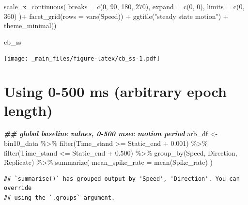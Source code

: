 \documentclass[
]{book}
\newenvironment{Shaded}{\begin{snugshade}}{\end{snugshade}}
\newcommand{\AttributeTok}[1]{\textcolor[rgb]{0.77,0.63,0.00}{#1}}
\newcommand{\DecValTok}[1]{\textcolor[rgb]{0.00,0.00,0.81}{#1}}
\newcommand{\DocumentationTok}[1]{\textcolor[rgb]{0.56,0.35,0.01}{\textbf{\textit{#1}}}}
\newcommand{\FloatTok}[1]{\textcolor[rgb]{0.00,0.00,0.81}{#1}}
\newcommand{\FunctionTok}[1]{\textcolor[rgb]{0.00,0.00,0.00}{#1}}
\newcommand{\NormalTok}[1]{#1}
\newcommand{\OtherTok}[1]{\textcolor[rgb]{0.56,0.35,0.01}{#1}}
\newcommand{\SpecialCharTok}[1]{\textcolor[rgb]{0.00,0.00,0.00}{#1}}
\newcommand{\StringTok}[1]{\textcolor[rgb]{0.31,0.60,0.02}{#1}}
\begin{document}
\begin{Shaded}
\begin{Highlighting}[]
  \FunctionTok{scale\_x\_continuous}\NormalTok{(}
    \AttributeTok{breaks =} \FunctionTok{c}\NormalTok{(}\DecValTok{0}\NormalTok{, }\DecValTok{90}\NormalTok{, }\DecValTok{180}\NormalTok{, }\DecValTok{270}\NormalTok{),}
    \AttributeTok{expand =} \FunctionTok{c}\NormalTok{(}\DecValTok{0}\NormalTok{, }\DecValTok{0}\NormalTok{),}
    \AttributeTok{limits =} \FunctionTok{c}\NormalTok{(}\DecValTok{0}\NormalTok{, }\DecValTok{360}\NormalTok{)}
\NormalTok{  )}\SpecialCharTok{+}
  \FunctionTok{facet\_grid}\NormalTok{(}\AttributeTok{rows =} \FunctionTok{vars}\NormalTok{(Speed)) }\SpecialCharTok{+}
  \FunctionTok{ggtitle}\NormalTok{(}\StringTok{"steady state motion"}\NormalTok{) }\SpecialCharTok{+}
  \FunctionTok{theme\_minimal}\NormalTok{()}

\NormalTok{cb\_ss}
\end{Highlighting}
\end{Shaded}

\texttt{[image: \_main\_files/figure-latex/cb\_ss-1.pdf]}

\hypertarget{using-0-500-ms-arbitrary-epoch-length}{%
\section{Using 0-500 ms (arbitrary epoch length)}\label{using-0-500-ms-arbitrary-epoch-length}}

\begin{Shaded}
\begin{Highlighting}[]
\DocumentationTok{\#\# global baseline values, 0{-}500 msec motion period}
\NormalTok{arb\_df }\OtherTok{\textless{}{-}}
\NormalTok{  bin10\_data }\SpecialCharTok{\%\textgreater{}\%}
  \FunctionTok{filter}\NormalTok{(Time\_stand }\SpecialCharTok{\textgreater{}=}\NormalTok{ Static\_end }\SpecialCharTok{+} \FloatTok{0.001}\NormalTok{) }\SpecialCharTok{\%\textgreater{}\%}
  \FunctionTok{filter}\NormalTok{(Time\_stand }\SpecialCharTok{\textless{}=}\NormalTok{ Static\_end }\SpecialCharTok{+} \FloatTok{0.500}\NormalTok{) }\SpecialCharTok{\%\textgreater{}\%}
  \FunctionTok{group\_by}\NormalTok{(Speed, Direction, Replicate) }\SpecialCharTok{\%\textgreater{}\%}
  \FunctionTok{summarize}\NormalTok{(}
    \AttributeTok{mean\_spike\_rate =} \FunctionTok{mean}\NormalTok{(Spike\_rate)}
\NormalTok{  )}
\end{Highlighting}
\end{Shaded}

\begin{verbatim}
## `summarise()` has grouped output by 'Speed', 'Direction'. You can override
## using the `.groups` argument.
\end{verbatim}
\end{document}
